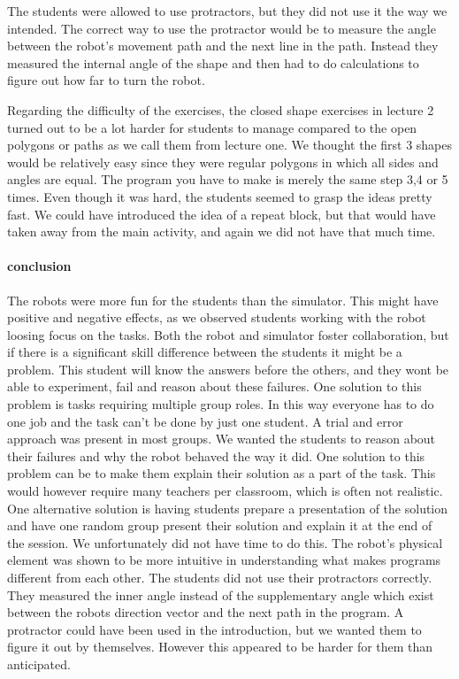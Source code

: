 \bigskip\noindent
The students were allowed to use protractors, but they did not use it the way we intended. The correct way to use the protractor would be to measure the angle between the robot's movement path and the next line in the path. Instead they measured the internal angle of the shape and then had to do calculations to figure out how far to turn the robot.

\bigskip\noindent
Regarding the difficulty of the exercises, the closed shape exercises in lecture 2 turned out to be a lot harder for students to manage compared to the open polygons or paths as we call them from lecture one. We thought the first 3 shapes would be relatively easy since they were regular polygons in which all sides and angles are equal. The program you have to make is merely the same step 3,4 or 5 times. Even though it was hard, the students seemed to grasp the ideas pretty fast. We could have introduced the idea of a repeat block, but that would have taken away from the main activity, and again we did not have that much time.

\paragraph{conclusion}
The robots were more fun for the students than the simulator.
This might have positive and negative effects, as we observed students working with the robot loosing focus on the tasks.  
Both the robot and simulator foster collaboration, but if there is a significant skill difference between the students it might be a problem. This student will know the answers before the others, and they wont be able to experiment, fail and reason about these failures. 
One solution to this problem is tasks requiring multiple group roles. In this way everyone has to do one job and the task can't be done by just one student.  
A trial and error approach was present in most groups. We wanted the students to reason about their failures and why the robot behaved the way it did. One solution to this problem can be to make them explain their solution as a part of the task. This would however require many teachers per classroom, which is often not realistic. One alternative solution is having students prepare a presentation of the solution and have one random group present their solution and explain it at the end of the session. We unfortunately did not have time to do this.  
The robot's physical element was shown to be more intuitive in understanding what makes programs different from each other.
The students did not use their protractors correctly. They measured the inner angle instead of the supplementary angle which exist between the robots direction vector and the next path in the program. A protractor could have been used in the introduction, but we wanted them to figure it out by themselves. However this appeared to be harder for them than anticipated.
